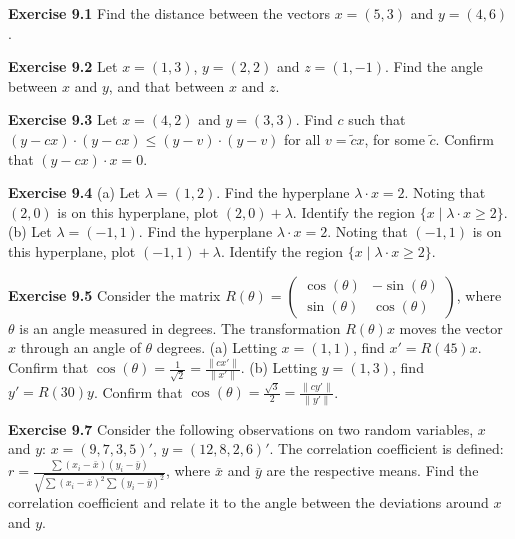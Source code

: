 \begin{original}
\textbf{Exercise 9.1} Find the distance between the vectors $x = (5,3)$ and $y = (4,6)$.

\textbf{Exercise 9.2} Let $x = (1,3)$, $y = (2,2)$ and $z = (1,-1)$. Find the angle between $x$ and $y$, and that between $x$ and $z$.

\textbf{Exercise 9.3} Let $x = (4,2)$ and $y = (3,3)$. Find $c$ such that $(y - c x) \cdot (y - c x) \le (y - v) \cdot (y - v)$ for all $v = \tilde{c} x$, for some $\tilde{c}$. Confirm that $(y - c x) \cdot x = 0$.

\textbf{Exercise 9.4} (a) Let $\lambda = (1,2)$. Find the hyperplane $\lambda \cdot x = 2$. Noting that $(2,0)$ is on this hyperplane, plot $(2,0) + \lambda$. Identify the region $\{x \mid \lambda \cdot x \ge 2\}$. (b) Let $\lambda = (-1,1)$. Find the hyperplane $\lambda \cdot x = 2$. Noting that $(-1,1)$ is on this hyperplane, plot $(-1,1) + \lambda$. Identify the region $\{x \mid \lambda \cdot x \ge 2\}$.

\textbf{Exercise 9.5} Consider the matrix $R(\theta) = \begin{pmatrix} \cos(\theta) & -\sin(\theta) \\ \sin(\theta) & \cos(\theta) \end{pmatrix}$, where $\theta$ is an angle measured in degrees. The transformation $R(\theta)x$ moves the vector $x$ through an angle of $\theta$ degrees. (a) Letting $x = (1,1)$, find $x' = R(45)x$. Confirm that $\cos(\theta) = \frac{1}{\sqrt{2}} = \frac{\|c x'\|}{\|x'\|}$. (b) Letting $y = (1,3)$, find $y' = R(30)y$. Confirm that $\cos(\theta) = \frac{\sqrt{3}}{2} = \frac{\|c y'\|}{\|y'\|}$.

\textbf{Exercise 9.7} Consider the following observations on two random variables, $x$ and $y$: $x = (9, 7, 3, 5)'$, $y = (12, 8, 2, 6)'$. The correlation coefficient is defined: $r = \frac{\sum (x_i - \bar{x})(y_i - \bar{y})}{\sqrt{\sum (x_i - \bar{x})^2 \sum (y_i - \bar{y})^2}}$, where $\bar{x}$ and $\bar{y}$ are the respective means. Find the correlation coefficient and relate it to the angle between the deviations around $x$ and $y$.
\end{original}
